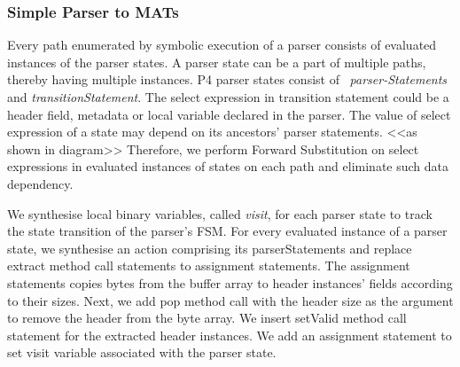 \subsubsection{Simple Parser to MATs}
\label{subsubsection:simple-parser-to-mats}
Every path enumerated by symbolic execution of a parser consists of evaluated instances of the parser states.
A parser state can be a part of multiple paths, thereby having multiple instances.
P4 parser states consist of ~\emph{parser-Statements}  and \emph{transition\-Statement}.
The select expression in transition statement could be a header field, metadata or local variable declared in the parser.
The value of select expression of a state may depend on its ancestors' parser statements. <<as shown in diagram>>
Therefore, we perform Forward Substitution on select expressions in evaluated instances of states
on each path and eliminate such data dependency.

We synthesise local binary variables, called \emph{visit},  for each parser state to track the state transition of the parser's FSM.
For every evaluated instance of a parser state, we synthesise an action comprising its parser\-Statements and replace extract method call statements to assignment statements.
The assignment statements copies bytes from the buffer array to header instances' fields according to their sizes.
Next, we add pop method call with the header size as the argument to remove the header from the byte array.
We insert setValid method call statement for the extracted header instances.
We add an assignment statement to set visit variable associated with the parser state.

